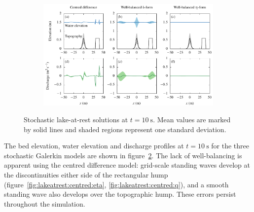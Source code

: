 \begin{figure}
\centering
\centering
\begin{subfigure}{\textwidth}
\label{fig:lakeatrest:centred:eta}
\label{fig:lakeatrest:hform:eta}
\label{fig:lakeatrest:etaform:eta}
\label{fig:lakeatrest:centred:q}
\label{fig:lakeatrest:hform:q}
\label{fig:lakeatrest:etaform:q}
\centering
\includegraphics{fig-lakeatrest.pdf}
\end{subfigure}
\caption{Stochastic lake-at-rest solutions at $t = \SI{10}{\second}$.  Mean values are marked by solid lines and shaded regions represent one standard deviation.}
\label{fig:lakeatrest}
\end{figure}

The bed elevation, water elevation and discharge profiles at $t = \SI{10}{\second}$ for the three stochastic Galerkin models are shown in figure~\ref{fig:lakeatrest}.
The lack of well-balancing is apparent using the centred difference model: grid-scale standing waves develop at the discontinuities either side of the rectangular hump (figure~\ref{fig:lakeatrest:centred:eta}, \ref{fig:lakeatrest:centred:q}), and a smooth standing wave also develops over the topographic hump.  These errors persist throughout the simulation.

